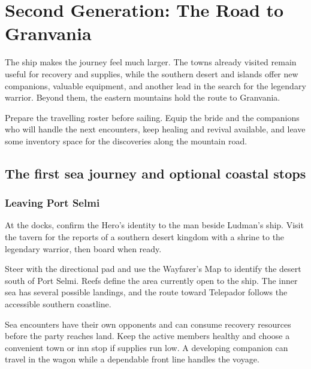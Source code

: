 \chapter{Second Generation: The Road to Granvania}
\label{written-granvania}


The ship makes the journey feel much larger. The towns already visited
remain useful for recovery and supplies, while the southern desert and
islands offer new companions, valuable equipment, and another lead in
the search for the legendary warrior. Beyond them, the eastern mountains
hold the route to Granvania.

Prepare the travelling roster before sailing. Equip the bride and the
companions who will handle the next encounters, keep healing and revival
available, and leave some inventory space for the discoveries along
the mountain road.

\section{The first sea journey and optional coastal stops}

\subsection*{Leaving Port Selmi}

At the docks, confirm the Hero's identity to the man beside Ludman's
ship. Visit the tavern for the reports of a southern desert kingdom
with a shrine to the legendary warrior, then board when ready.

Steer with the directional pad and use the Wayfarer's Map to identify
the desert south of Port Selmi. Reefs define the area currently open
to the ship. The inner sea has several possible landings, and the
route toward Telepador follows the accessible southern coastline.

Sea encounters have their own opponents and can consume recovery
resources before the party reaches land. Keep the active members
healthy and choose a convenient town or inn stop if supplies run low.
A developing companion can travel in the wagon while a dependable
front line handles the voyage.

